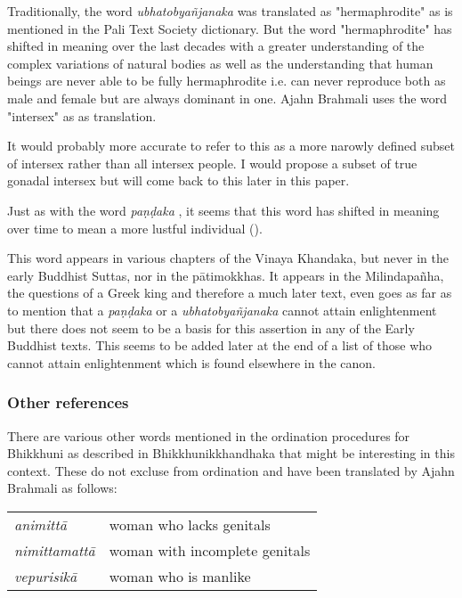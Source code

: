 Traditionally, the word {\em ubhatob­yañ­janaka } was translated as "hermaphrodite" as is mentioned in the Pali Text Society dictionary. But the word "hermaphrodite" has shifted in meaning over the last decades with a greater understanding of the complex variations of natural bodies as well as the understanding that human beings are never able to be fully hermaphrodite i.e. can never reproduce both as male and female but are always dominant in one. Ajahn Brahmali uses the word "intersex" as as translation.

It would probably more accurate to refer to this as a more narowly defined subset of intersex rather than all intersex people. I would propose a subset of true gonadal intersex but will come back to this later in this paper.

Just as with the word {\em paṇḍaka }, it seems that this word has shifted in meaning over time to mean a more lustful individual (\cite{vimala}).

This word appears in various chapters of the Vinaya Khandaka, but never in the early Buddhist Suttas, nor in the pātimokkhas. It appears in the Milindapañha, the questions of a Greek king and therefore a much later text, even goes as far as to mention that a {\em paṇḍaka } or a {\em ubhatob­yañ­janaka } cannot attain enlightenment but there does not seem to be a basis for this assertion in any of the Early Buddhist texts. This seems to be added later at the end of a list of those who cannot attain enlightenment which is found elsewhere in the canon.


\subsubsection{Other references}
There are various other words mentioned in the ordination procedures for Bhikkhuni as described in Bhikkhunikkhandhaka that might be interesting in this context. These do not excluse from ordination and have been translated by Ajahn Brahmali as follows: \\

\begin{tabular}{ l l }
 {\em animittā } & woman who lacks genitals \\
 {\em nimittamattā } & woman with incomplete genitals \\ 
 {\em vepurisikā } & woman who is manlike \\
\end{tabular} \\

